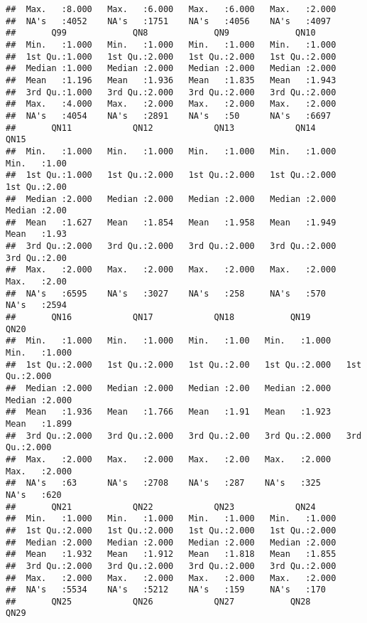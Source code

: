 \documentclass[
]{article}
\begin{document}
\begin{verbatim}
##  Max.   :8.000   Max.   :6.000   Max.   :6.000   Max.   :2.000  
##  NA's   :4052    NA's   :1751    NA's   :4056    NA's   :4097   
##       Q99             QN8             QN9             QN10      
##  Min.   :1.000   Min.   :1.000   Min.   :1.000   Min.   :1.000  
##  1st Qu.:1.000   1st Qu.:2.000   1st Qu.:2.000   1st Qu.:2.000  
##  Median :1.000   Median :2.000   Median :2.000   Median :2.000  
##  Mean   :1.196   Mean   :1.936   Mean   :1.835   Mean   :1.943  
##  3rd Qu.:1.000   3rd Qu.:2.000   3rd Qu.:2.000   3rd Qu.:2.000  
##  Max.   :4.000   Max.   :2.000   Max.   :2.000   Max.   :2.000  
##  NA's   :4054    NA's   :2891    NA's   :50      NA's   :6697   
##       QN11            QN12            QN13            QN14            QN15     
##  Min.   :1.000   Min.   :1.000   Min.   :1.000   Min.   :1.000   Min.   :1.00  
##  1st Qu.:1.000   1st Qu.:2.000   1st Qu.:2.000   1st Qu.:2.000   1st Qu.:2.00  
##  Median :2.000   Median :2.000   Median :2.000   Median :2.000   Median :2.00  
##  Mean   :1.627   Mean   :1.854   Mean   :1.958   Mean   :1.949   Mean   :1.93  
##  3rd Qu.:2.000   3rd Qu.:2.000   3rd Qu.:2.000   3rd Qu.:2.000   3rd Qu.:2.00  
##  Max.   :2.000   Max.   :2.000   Max.   :2.000   Max.   :2.000   Max.   :2.00  
##  NA's   :6595    NA's   :3027    NA's   :258     NA's   :570     NA's   :2594  
##       QN16            QN17            QN18           QN19            QN20      
##  Min.   :1.000   Min.   :1.000   Min.   :1.00   Min.   :1.000   Min.   :1.000  
##  1st Qu.:2.000   1st Qu.:2.000   1st Qu.:2.00   1st Qu.:2.000   1st Qu.:2.000  
##  Median :2.000   Median :2.000   Median :2.00   Median :2.000   Median :2.000  
##  Mean   :1.936   Mean   :1.766   Mean   :1.91   Mean   :1.923   Mean   :1.899  
##  3rd Qu.:2.000   3rd Qu.:2.000   3rd Qu.:2.00   3rd Qu.:2.000   3rd Qu.:2.000  
##  Max.   :2.000   Max.   :2.000   Max.   :2.00   Max.   :2.000   Max.   :2.000  
##  NA's   :63      NA's   :2708    NA's   :287    NA's   :325     NA's   :620    
##       QN21            QN22            QN23            QN24      
##  Min.   :1.000   Min.   :1.000   Min.   :1.000   Min.   :1.000  
##  1st Qu.:2.000   1st Qu.:2.000   1st Qu.:2.000   1st Qu.:2.000  
##  Median :2.000   Median :2.000   Median :2.000   Median :2.000  
##  Mean   :1.932   Mean   :1.912   Mean   :1.818   Mean   :1.855  
##  3rd Qu.:2.000   3rd Qu.:2.000   3rd Qu.:2.000   3rd Qu.:2.000  
##  Max.   :2.000   Max.   :2.000   Max.   :2.000   Max.   :2.000  
##  NA's   :5534    NA's   :5212    NA's   :159     NA's   :170    
##       QN25            QN26            QN27           QN28            QN29      

\end{verbatim}
\end{document}
